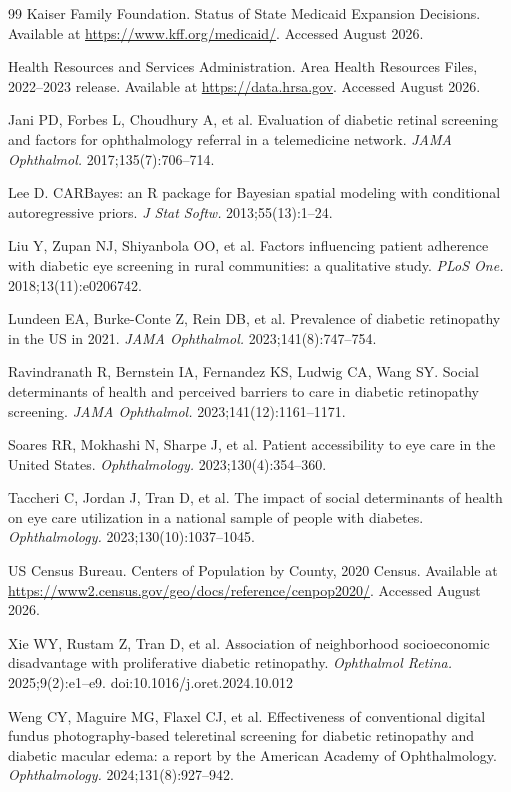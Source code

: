 \documentclass[11pt]{article}
\begin{document}
\begin{thebibliography}{99}
Kaiser Family Foundation. Status of State Medicaid Expansion Decisions.
Available at \url{https://www.kff.org/medicaid/}. Accessed August 2026.

Health Resources and Services Administration. Area Health Resources Files,
2022--2023 release. Available at \url{https://data.hrsa.gov}. Accessed August
2026.

Jani PD, Forbes L, Choudhury A, et al. Evaluation of diabetic retinal screening
and factors for ophthalmology referral in a telemedicine network. \emph{JAMA
Ophthalmol.} 2017;135(7):706--714.

Lee D. CARBayes: an R package for Bayesian spatial modeling with conditional
autoregressive priors. \emph{J Stat Softw.} 2013;55(13):1--24.

Liu Y, Zupan NJ, Shiyanbola OO, et al. Factors influencing patient adherence
with diabetic eye screening in rural communities: a qualitative study.
\emph{PLoS One.} 2018;13(11):e0206742.

Lundeen EA, Burke-Conte Z, Rein DB, et al. Prevalence of diabetic retinopathy in
the US in 2021. \emph{JAMA Ophthalmol.} 2023;141(8):747--754.

Ravindranath R, Bernstein IA, Fernandez KS, Ludwig CA, Wang SY. Social
determinants of health and perceived barriers to care in diabetic retinopathy
screening. \emph{JAMA Ophthalmol.} 2023;141(12):1161--1171.

Soares RR, Mokhashi N, Sharpe J, et al. Patient accessibility to eye care in the
United States. \emph{Ophthalmology.} 2023;130(4):354--360.

Taccheri C, Jordan J, Tran D, et al. The impact of social determinants of health
on eye care utilization in a national sample of people with diabetes.
\emph{Ophthalmology.} 2023;130(10):1037--1045.

US Census Bureau. Centers of Population by County, 2020 Census. Available at
\url{https://www2.census.gov/geo/docs/reference/cenpop2020/}. Accessed August
2026.

Xie WY, Rustam Z, Tran D, et al. Association of neighborhood socioeconomic
disadvantage with proliferative diabetic retinopathy. \emph{Ophthalmol Retina.}
2025;9(2):e1--e9. doi:10.1016/j.oret.2024.10.012

Weng CY, Maguire MG, Flaxel CJ, et al. Effectiveness of conventional digital
fundus photography-based teleretinal screening for diabetic retinopathy and
diabetic macular edema: a report by the American Academy of Ophthalmology.
\emph{Ophthalmology.} 2024;131(8):927--942.

\end{thebibliography}
\end{document}
